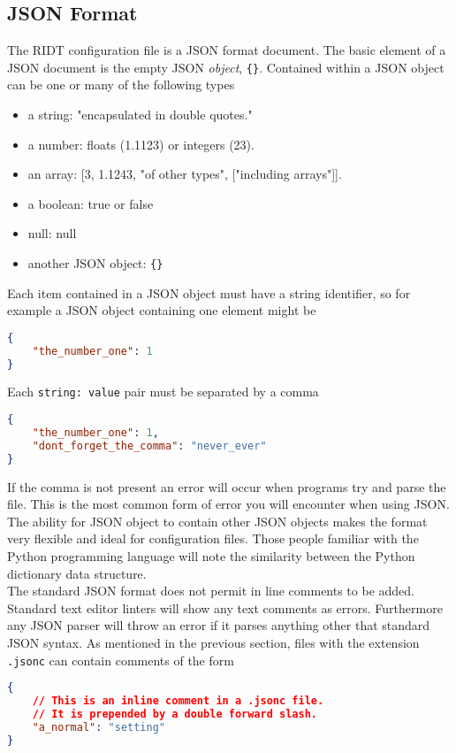 \documentclass[]{article}
\def\code#1{\texttt{#1}}
\begin{document}
\subsection{JSON Format}

The RIDT configuration file is a JSON format document. The basic element of a
JSON document is the empty JSON \emph{object}, \code{\{\}}. Contained within
a JSON object can be one or many of the following types
\begin{itemize}
    \item a string: "encapsulated in double quotes."
    \item a number: floats (1.1123) or integers (23).
    \item an array: [3, 1.1243, "of other types", ["including arrays"]].
    \item a boolean: true or false
    \item null: null
    \item another JSON object: \code{\{\}}
\end{itemize}
Each item contained in a JSON object must have a string identifier, so for
example a JSON object containing one element might be\\
\begin{lstlisting}[language=json,firstnumber=1]
{
    "the_number_one": 1
}
\end{lstlisting}
\medskip
Each \code{string: value} pair must be separated by a comma\\
\begin{lstlisting}[language=json,firstnumber=1]
{
    "the_number_one": 1,
    "dont_forget_the_comma": "never_ever"
}
\end{lstlisting}
\medskip
If the comma is not present an error will occur when programs try and parse the
file. This is the most common form of error you will encounter when using
JSON.\\

\noindent The ability for JSON object to contain other JSON objects makes the
format very flexible and ideal for configuration files. Those people familiar
with the Python programming language will note the similarity between the Python
dictionary data structure.\\

\noindent The standard JSON format does not permit in line comments to be added.
Standard text editor linters will show any text comments as errors. Furthermore
any JSON parser will throw an error if it parses anything other that standard
JSON syntax. As mentioned in the previous section, files with the extension
\code{.jsonc} can contain comments of the form\\
\begin{lstlisting}[language=json, firstnumber=1]
{
    // This is an inline comment in a .jsonc file.
    // It is prepended by a double forward slash.
    "a_normal": "setting"
}
\end{lstlisting}
\medskip
\end{document}

